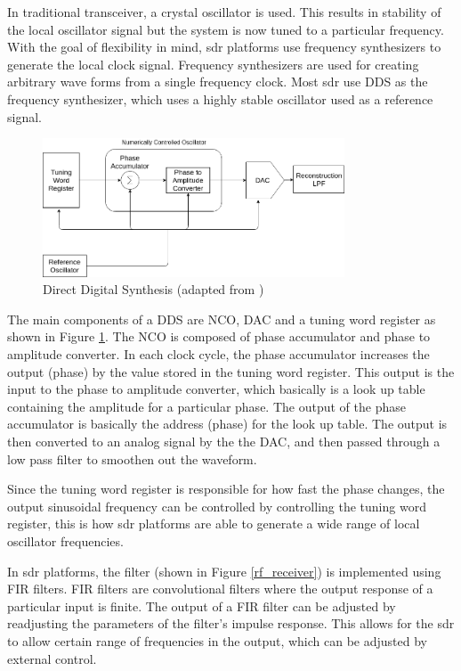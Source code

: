 \begin{itemize}
In traditional transceiver, a crystal oscillator is used.
This results in stability of the local oscillator signal but the system is now tuned to a particular frequency.
With the goal of flexibility in mind, \ac{sdr} platforms use frequency synthesizers to generate the local clock signal.
Frequency synthesizers are used for creating arbitrary wave forms from a single frequency clock.
Most \ac{sdr} use \ac{DDS} as the frequency synthesizer, which uses a highly stable oscillator used as a reference signal.



\begin{figure}[h!]
\centering
\includegraphics[width=0.8\textwidth]{Figure/DDS.png}
\caption{Direct Digital Synthesis (adapted from \cite{noauthor_direct_2018})}
\label{dds}
\end{figure}

The main components of a \ac{DDS} are \ac{NCO}, \ac{DAC} and a tuning word register as shown in Figure \ref{dds}.
The \ac{NCO} is composed of phase accumulator and phase to amplitude converter.
In each clock cycle, the phase accumulator increases the output (phase) by the value stored in the tuning word register.
This output is the input to the phase to amplitude converter, which basically is a look up table containing the amplitude for a particular phase.
The output of the phase accumulator is basically the address (phase) for the look up table.
The output is then converted to an analog signal by the the \ac{DAC}, and then passed through a low pass filter to smoothen out the waveform.

Since the tuning word register is responsible for how fast the phase changes, the output sinusoidal frequency can be controlled by controlling the tuning word register, this is how \ac{sdr} platforms are able to generate a wide range of local oscillator frequencies.

In \ac{sdr} platforms, the filter (shown in Figure \ref{rf_receiver}) is implemented using \ac{FIR} filters.
\ac{FIR} filters are convolutional filters where the output response of a particular input is finite.
The output of a \ac{FIR} filter can be adjusted by readjusting the parameters of the filter's impulse response.
This allows for the \ac{sdr} to allow certain range of frequencies in the output, which can be adjusted by external control.


\end{itemize}
